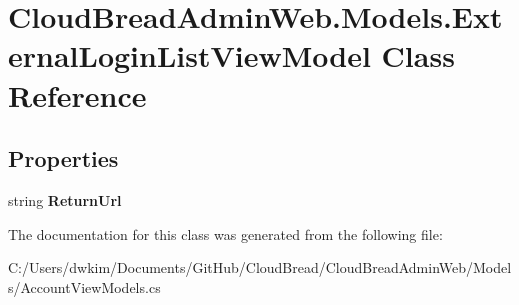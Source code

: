 \hypertarget{class_cloud_bread_admin_web_1_1_models_1_1_external_login_list_view_model}{}\section{Cloud\+Bread\+Admin\+Web.\+Models.\+External\+Login\+List\+View\+Model Class Reference}
\label{class_cloud_bread_admin_web_1_1_models_1_1_external_login_list_view_model}
\subsection*{Properties}
\begin{DoxyCompactItemize}
\item 
string {\bfseries Return\+Url}\hypertarget{class_cloud_bread_admin_web_1_1_models_1_1_external_login_list_view_model_aba1f7839a258af305afb7ae5282bf01f}{}\label{class_cloud_bread_admin_web_1_1_models_1_1_external_login_list_view_model_aba1f7839a258af305afb7ae5282bf01f}

\end{DoxyCompactItemize}


The documentation for this class was generated from the following file\+:\begin{DoxyCompactItemize}
\item 
C\+:/\+Users/dwkim/\+Documents/\+Git\+Hub/\+Cloud\+Bread/\+Cloud\+Bread\+Admin\+Web/\+Models/Account\+View\+Models.\+cs\end{DoxyCompactItemize}
